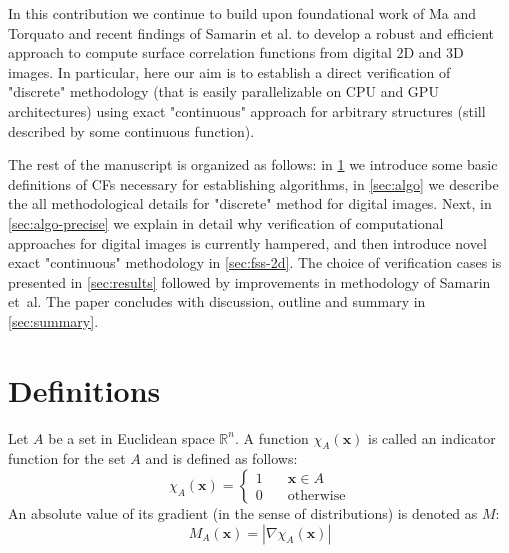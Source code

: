 \documentclass[1p]{elsarticle}
\begin{document}
In this contribution we continue to build upon foundational work of Ma and
Torquato \cite{ma2018SS} and recent findings of Samarin et al. \cite{Samarin} to
develop a robust and efficient approach to compute surface correlation functions
from digital 2D and 3D images. In particular, here our aim is to establish a
direct verification of "discrete" methodology (that is easily parallelizable on
CPU and GPU architectures) using exact "continuous" approach for arbitrary
structures (still described by some continuous function).

The rest of the manuscript is organized as follows: in \cref{sec:def} we
introduce some basic definitions of CFs necessary for establishing algorithms,
in \cref{sec:algo} we describe the all methodological details for "discrete"
method for digital images. Next, in \cref{sec:algo-precise} we explain in detail
why verification of computational approaches for digital images is currently
hampered, and then introduce novel exact "continuous" methodology in
\cref{sec:fss-2d}. The choice of verification cases is presented in
\cref{sec:results} followed by improvements in methodology of Samarin et~al. The
paper concludes with discussion, outline and summary in \cref{sec:summary}.

\section{Definitions}
\label{sec:def}
Let $A$ be a set in Euclidean space $\mathbb{R}^n$. A function
$\chi_A(\mathbf{x})$ is called an indicator function for the set $A$ and is
defined as follows:
\begin{equation}
  \chi_A(\bm{x}) = \left\{
  \begin{array}{ll}
    1 & \quad \bm{x} \in A \\
    0 & \quad \text{otherwise}
  \end{array}
  \right.
\end{equation}
An absolute value of its gradient (in the sense of distributions) is denoted
as $M$:
\begin{equation}
  M_A(\bm{x}) = |\nabla \chi_A(\bm{x})|
\end{equation}
\end{document}

